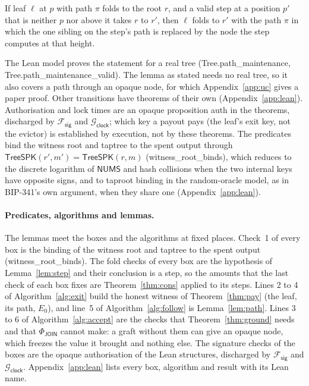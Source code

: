 \documentclass[runningheads]{llncs}
\newif\iffullversion
\newcommand{\lifted}[1]{\iffullversion\S\ref{#1}\else Appendix~\ref{#1}\fi}
\newcommand{\NUMS}{\ensuremath{\mathsf{NUMS}}}
\newcommand{\TreeSpk}{\ensuremath{\mathsf{TreeSPK}}}
\newcommand{\tr}[1]{\textsf{#1}}
\newcommand{\Emp}{\ensuremath{E}}
\newcommand{\lean}[1]{{\small\textsf{#1}}}
\newcommand{\Gclock}{\ensuremath{\mathcal{G}_{\mathsf{clock}}}}
\newcommand{\Fsig}{\ensuremath{\mathcal{F}_{\mathsf{sig}}}}
\begin{document}
\begin{lemma}\label{lem:path}
If leaf $\ell$ at $p$ with path $\pi$ folds to the root $r$, and a valid
step at a position $p'$ that is neither $p$ nor above it takes $r$ to
$r'$, then $\ell$ folds to $r'$ with the path $\pi$ in which the one
sibling on the step's path is replaced by the node the step computes at
that height.
\end{lemma}
\noindent The Lean model proves the statement for a real tree
(\lean{Tree.path\_maintenance}, \lean{Tree.path\_maintenance\_valid}).
The lemma as stated needs no real tree, so it also covers a path through
an opaque node, for which \lifted{app:uc} gives a paper proof. Other
transitions have theorems of their own (Appendix~\ref{app:lean}).
Authorisation and lock times are an opaque proposition \lean{auth} in
the theorems, discharged by $\Fsig$ and $\Gclock$; which key a payout
pays (the leaf's exit key, not the evictor) is established by execution,
not by these theorems. The predicates bind the witness root and taptree
to the spent output through $\TreeSpk(r', m') = \TreeSpk(r, m)$
(\lean{witness\_root\_binds}), which reduces to the discrete logarithm of
$\NUMS$ and hash collisions when the two internal keys have opposite
signs, and to taproot binding in the random-oracle model, as in BIP-341's
own argument, when they share one (Appendix~\ref{app:lean}).

\paragraph{Predicates, algorithms and lemmas.} The lemmas meet the boxes
and the algorithms at fixed places. Check~1 of every box is the binding
of the witness root and taptree to the spent output
(\lean{witness\_root\_binds}). The fold checks of every box are the
hypothesis of Lemma~\ref{lem:step} and their conclusion is a step, so
the amounts that the last check of each box fixes are Theorem~\ref{thm:cons}
applied to its steps. Lines 2 to 4 of Algorithm~\ref{alg:exit} build the
honest witness of Theorem~\ref{thm:pay} (the leaf, its path, $\Emp_0$),
and line~5 of Algorithm~\ref{alg:follow} is Lemma~\ref{lem:path}.
Lines 3 to 6 of Algorithm~\ref{alg:accept} are the checks that
Theorem~\ref{thm:ground} needs and that $\Phi_{\tr{JOIN}}$ cannot make:
a graft without them can give an opaque node, which freezes the value it
brought and nothing else. The signature checks of the boxes are the
opaque authorisation of the Lean structures, discharged by $\Fsig$ and
$\Gclock$. Appendix~\ref{app:lean} lists every box, algorithm and
result with its Lean name.
\end{document}
